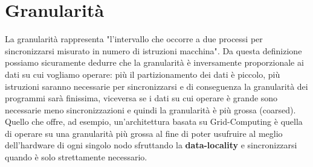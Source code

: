 \section{Granularità}
La granularità rappresenta "l'intervallo che occorre a due processi per sincronizzarsi misurato in numero di istruzioni macchina"\cite{cattaneo88}. Da questa definizione possiamo sicuramente dedurre che la granularità è inversamente proporzionale ai dati su cui vogliamo operare: più il partizionamento dei dati è piccolo, più istruzioni saranno necessarie per sincronizzarsi e di conseguenza la granularità dei programmi sarà finissima, viceversa se i dati su cui operare è grande sono necessarie meno sincronizzazioni e quindi la granularità è più grossa (coarsed). Quello che offre, ad esempio, un'architettura basata su Grid-Computing è quella di operare su una granularità più grossa al fine di poter usufruire al meglio dell'hardware di ogni singolo nodo sfruttando la \textbf{data-locality} e sincronizzarsi quando è solo strettamente necessario.
